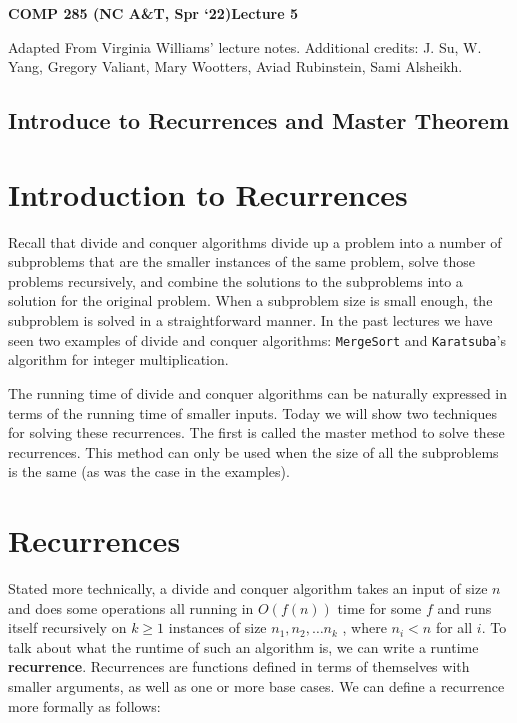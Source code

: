 \documentclass [12pt]{article}
\begin{document}
 

{\LARGE \textbf {COMP 285 (NC A\&T, Spr `22)}\hfill \textbf {Lecture 5} } 
\vspace {1em} 
\begin {Instruction} 

Adapted From Virginia Williams' lecture notes. Additional credits: J. Su, W. Yang, Gregory Valiant, Mary Wootters, Aviad Rubinstein, Sami Alsheikh.
\end {Instruction} 

\begin{centering}
\section*{Introduce to Recurrences and Master Theorem}
\end{centering}

\section{Introduction to Recurrences}

Recall that divide and conquer algorithms divide up a problem into a number of subproblems that are the smaller instances of the same problem, solve those problems recursively, and combine the solutions to the subproblems into a solution for the original problem. When a subproblem size is small enough, the subproblem is solved in a straightforward manner. In the past lectures we have seen two examples of divide and conquer algorithms: \texttt{MergeSort} and \texttt{Karatsuba}’s algorithm for integer multiplication.

The running time of divide and conquer algorithms can be naturally expressed in terms of the running time of smaller inputs. Today we will show two techniques for solving these recurrences. The first is called the master method to solve these recurrences. This method can only be used when the size of all the subproblems is the same (as was the case in the examples).

\section{Recurrences}
Stated more technically, a divide and conquer algorithm takes an input of size $n$ and does some operations all running in $O(f (n))$ time for some $f$ and runs itself recursively on $k \geq 1$ instances of size $n_1, n_2, \dots n_k$ , where $n_i < n$ for all $i$. To talk about what the runtime of such an algorithm is, we can write a runtime \textbf{recurrence}. Recurrences are functions defined in terms of themselves with smaller arguments, as well as one or more base cases. We can
define a recurrence more formally as follows:
\end{document}
